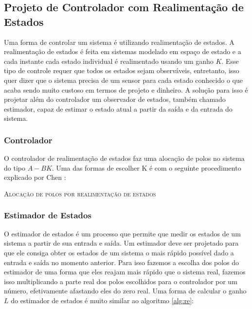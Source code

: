 \subsection{Projeto de Controlador com Realimentação de Estados}

Uma forma de controlar um sistema é utilizando realimentação de estados. A realimentação de estados é feita em sistemas modelado em espaço de estado e a cada instante cada estado individual é realimentado usando um ganho $K$. Esse tipo de controle requer que todos os estados sejam observáveis, entretanto, isso quer dizer que o sistema precisa de um sensor para cada estado conhecido o que acaba sendo muito custoso em termos de projeto e dinheiro. A solução para isso é projetar além do controlador um observador de estados, também chamado estimador, capaz de estimar o estado atual a partir da saída e da entrada do sistema.

\subsubsection{Controlador}

O controlador de realimentação de estados faz uma alocação de polos no sistema do tipo $A-BK$. Uma das formas de escolher K é com o seguinte procedimento explicado por Chen \cite{chen1998}:

\IncMargin{1em}
\begin{algorithm}[H]
	
	\label{alg:re}
	\caption{\textsc{Alocação de polos por realimentação de estados}}
\end{algorithm}
\DecMargin{1em}

\subsubsection{Estimador de Estados}

O estimador de estados é um processo que permite que medir os estados de um sistema a partir de sua entrada e saída. Um estimador deve ser projetado para que ele consiga obter os estados de um sistema o mais rápido possível dado a entrada e saída no momento anterior. Para isso fazemos a escolha dos polos do estimador de uma forma que eles reajam mais rápido que o sistema real, fazemos isso multiplicando a parte real dos polos escolhidos para o controlador por um número, efetivamente afastando eles do zero real. Uma forma de calcular o ganho $L$ do estimador de estados é muito similar ao algoritmo \ref{alg:re}:
\newline


